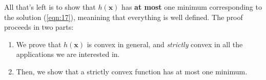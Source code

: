 \documentclass[../template.tex]{subfiles}
\begin{document}
\begin{comment}
    \begin{thm}\label{thm:18}
    The following function $h(\bm{\lambda})$ is convex:
    \begin{align}\label{eqn:18}
        h(\bm{\lambda}) = - \bm{g} \cdot \frac{\bm{\lambda}}{k_B} + \ln Z(\bm{\lambda}) 
    \end{align}
    where $\bm{g} \cdot \bm{\lambda} = \sum_{a=1}^m g_a \lambda_a$. Thus $h(\bm{\lambda})$ has at most one minimum corresponding to solution (\ref{eqn:17}). 
\end{thm}
\end{comment}


All that's left is to show that $h(\bm{x})$ has \textbf{at most} one minimum corresponding to the solution (\ref{eqn:17}), meanining that everything is well defined. The proof proceeds in two parts:
\begin{enumerate}
    \item We prove that $h(\bm{x})$ is convex in general, and \textit{strictly} convex in all the applications we are interested in.  
    \item Then, we show that a strictly convex function has at most one minimum.
\end{enumerate}
 
\end{document}
